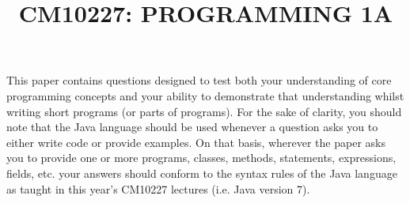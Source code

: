 \documentclass{exam}
\title{CM10227: PROGRAMMING 1A}
\date{}
\begin{document}
\maketitle

This paper contains questions designed to test both your understanding of core programming concepts and  your ability to demonstrate that understanding whilst writing short programs (or parts of programs). For the sake of clarity, you should note that the Java language should be used whenever a question asks you to either write code or provide examples. On that basis, wherever the paper asks you to provide one or more programs, classes, methods, statements, expressions, fields, etc. your answers should conform to the syntax rules of the Java language as taught in this year's CM10227 lectures (i.e. Java version 7).  

\clearpage
\end{document}
